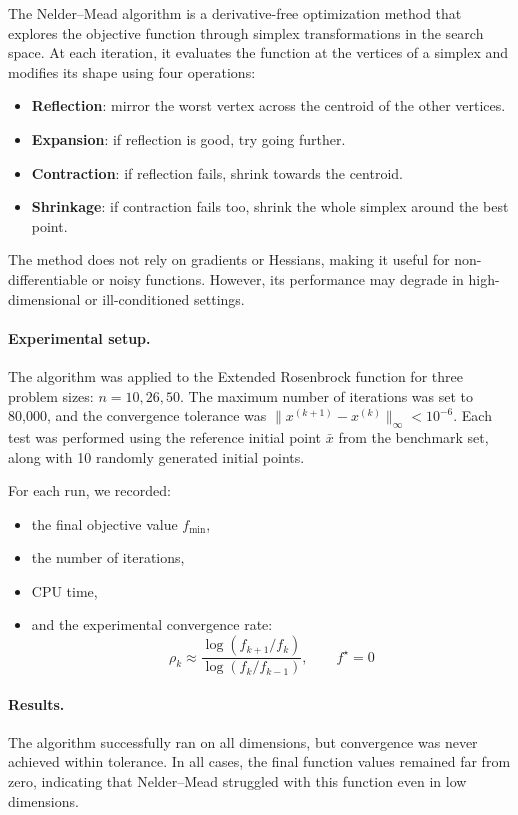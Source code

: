 \documentclass[a4paper,12pt]{article}
\begin{document}
	The Nelder–Mead algorithm is a derivative-free optimization method that explores the objective function through simplex transformations in the search space. At each iteration, it evaluates the function at the vertices of a simplex and modifies its shape using four operations:
	\begin{itemize}[nosep]
		\item \textbf{Reflection}: mirror the worst vertex across the centroid of the other vertices.
		\item \textbf{Expansion}: if reflection is good, try going further.
		\item \textbf{Contraction}: if reflection fails, shrink towards the centroid.
		\item \textbf{Shrinkage}: if contraction fails too, shrink the whole simplex around the best point.
	\end{itemize}
	The method does not rely on gradients or Hessians, making it useful for non-differentiable or noisy functions. However, its performance may degrade in high-dimensional or ill-conditioned settings.
	
	\paragraph{Experimental setup.}
	The algorithm was applied to the Extended Rosenbrock function for three problem sizes: \(n = 10, 26, 50\). The maximum number of iterations was set to 80,000, and the convergence tolerance was \( \|x^{(k+1)} - x^{(k)}\|_\infty < 10^{-6} \). Each test was performed using the reference initial point \( \bar{x} \) from the benchmark set, along with 10 randomly generated initial points.
	
	For each run, we recorded:
	\begin{itemize}[nosep]
		\item the final objective value \( f_{\min} \),
		\item the number of iterations,
		\item CPU time,
		\item and the experimental convergence rate:
		\[
		\rho_k \approx \frac{\log(f_{k+1}/f_k)}{\log(f_k / f_{k-1})}, \qquad f^\star = 0
		\]
	\end{itemize}
	\newpage
	\paragraph{Results.}
	The algorithm successfully ran on all dimensions, but convergence was never achieved within tolerance. In all cases, the final function values remained far from zero, indicating that Nelder–Mead struggled with this function even in low dimensions.
	
\end{document}
